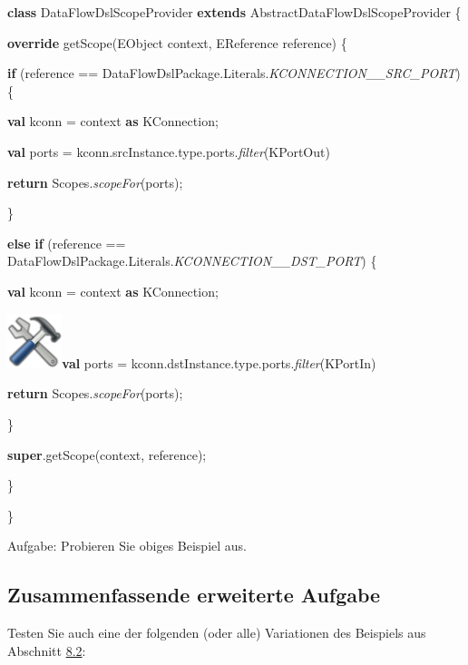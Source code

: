 \documentclass[]{article}
\begin{document}
\textbf{class} DataFlowDslScopeProvider \textbf{extends}
AbstractDataFlowDslScopeProvider \{

\textbf{override} getScope(EObject context, EReference reference) \{

\textbf{if} (reference ==
DataFlowDslPackage.Literals.\emph{KCONNECTION\_\_SRC\_PORT}) \{

\textbf{val} kconn = context \textbf{as} KConnection;

\textbf{val} ports =
kconn.srcInstance.type.ports.\emph{filter}(KPortOut)

\textbf{return} Scopes.\emph{scopeFor}(ports);

\}

\textbf{else} \textbf{if} (reference ==
DataFlowDslPackage.Literals.\emph{KCONNECTION\_\_DST\_PORT}) \{

\textbf{val} kconn = context \textbf{as} KConnection;

\includegraphics[width=0.62800in,height=0.62800in]{./Pictures/1000020100000080000000807EA91CDFA7B7F397.png}\textbf{val}
ports = kconn.dstInstance.type.ports.\emph{filter}(KPortIn)

\textbf{return} Scopes.\emph{scopeFor}(ports);

\}

\textbf{super}.getScope(context, reference);

\}

\}

Aufgabe: Probieren Sie obiges Beispiel aus.

\subsection[Zusammenfassende erweiterte
Aufgabe]{\texorpdfstring{\protect\hypertarget{anchor-47}{}{}Zusammenfassende
erweiterte
Aufgabe}{Zusammenfassende erweiterte Aufgabe}}\label{zusammenfassende-erweiterte-aufgabe}

Testen Sie auch eine der folgenden (oder alle) Variationen des Beispiels
aus Abschnitt \protect\hyperlink{anchor-46}{8.2}:
\end{document}
